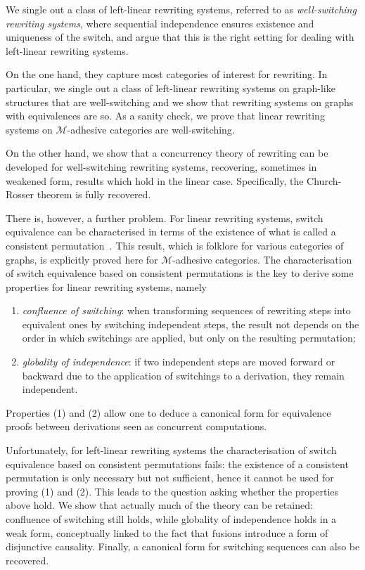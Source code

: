 \documentclass[a4paper,UKenglish,cleveref,pdftex, thm-restate,numberwithinsect,anonymous]{lipics}
\begin{document}
We single out a class of left-linear rewriting
systems, referred to as \emph{well-switching rewriting systems}, where sequential independence ensures existence and uniqueness of the
switch, and argue that this is the right setting for dealing with
left-linear rewriting systems.


On the one hand, they capture most categories of
interest for rewriting. In particular, we single out a class of
left-linear rewriting systems on graph-like structures that are
well-switching and we show that rewriting systems on graphs with
equivalences are so. 
As a sanity check, we prove that linear rewriting systems on
$\mathcal{M}$-adhesive categories are well-switching.

On the other hand, we show that a concurrency theory of rewriting can
be developed for well-switching rewriting systems, recovering, sometimes in
weakened form, results which hold in the linear case.  Specifically, 
the Church-Rosser theorem is fully recovered.


There is, however, a further problem.  For linear
rewriting systems, switch equivalence can be characterised in terms of the
existence of what is called a consistent permutation~\cite{xxx}.
This result, which
is folklore for various categories of graphs, is explicitly proved
here for $\mathcal{M}$-adhesive categories.
%
The characterisation of switch equivalence based on consistent
permutations is the key to derive some
properties for linear rewriting systems, namely
\begin{enumerate}
\item \emph{confluence of switching}: when transforming
  sequences of rewriting steps into equivalent ones by switching independent steps, the
  result not depends on the order in which switchings are applied, but
  only on the resulting permutation;
  
\item \emph{globality of independence}: if two independent steps are
  moved forward or backward due to the application of switchings to a
  derivation, they remain independent.
\end{enumerate}
Properties (1) and (2) allow one to deduce a canonical form for equivalence proofs between derivations seen as concurrent computations.

Unfortunately, for left-linear rewriting systems the characterisation
of switch equivalence based on consistent permutations fails: the
existence of a consistent permutation is only necessary but not
sufficient, hence it cannot be used for proving (1) and (2).
%
This leads to the question asking whether the properties above hold.
We show that actually much of the theory can be retained: confluence
of switching still holds, while globality of independence holds in a
weak form, conceptually linked to the fact that fusions introduce a
form of disjunctive causality. Finally, a canonical form for switching
sequences can also be recovered.
\end{document}
